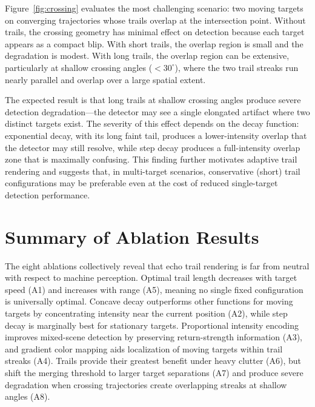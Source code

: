 \documentclass[twocolumn, 10pt]{article}
\begin{document}
Figure~\ref{fig:crossing} evaluates the most challenging scenario: two moving targets on converging trajectories whose trails overlap at the intersection point. Without trails, the crossing geometry has minimal effect on detection because each target appears as a compact blip. With short trails, the overlap region is small and the degradation is modest. With long trails, the overlap region can be extensive, particularly at shallow crossing angles ($<30^\circ$), where the two trail streaks run nearly parallel and overlap over a large spatial extent.

The expected result is that long trails at shallow crossing angles produce severe detection degradation---the detector may see a single elongated artifact where two distinct targets exist. The severity of this effect depends on the decay function: exponential decay, with its long faint tail, produces a lower-intensity overlap that the detector may still resolve, while step decay produces a full-intensity overlap zone that is maximally confusing. This finding further motivates adaptive trail rendering and suggests that, in multi-target scenarios, conservative (short) trail configurations may be preferable even at the cost of reduced single-target detection performance.


\section{Summary of Ablation Results}

The eight ablations collectively reveal that echo trail rendering is far from neutral with respect to machine perception. Optimal trail length decreases with target speed (A1) and increases with range (A5), meaning no single fixed configuration is universally optimal. Concave decay outperforms other functions for moving targets by concentrating intensity near the current position (A2), while step decay is marginally best for stationary targets. Proportional intensity encoding improves mixed-scene detection by preserving return-strength information (A3), and gradient color mapping aids localization of moving targets within trail streaks (A4). Trails provide their greatest benefit under heavy clutter (A6), but shift the merging threshold to larger target separations (A7) and produce severe degradation when crossing trajectories create overlapping streaks at shallow angles (A8).
\end{document}
